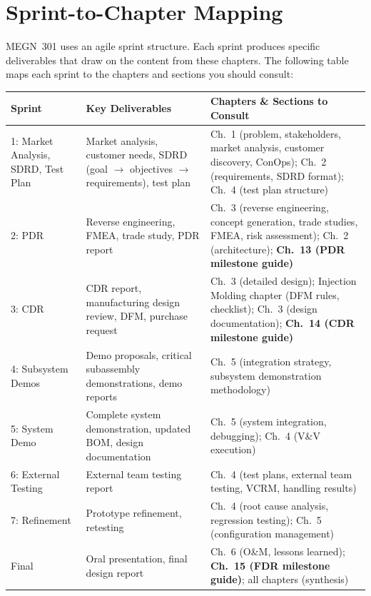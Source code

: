 \documentclass[11pt,letterpaper,twoside,openany]{book}
\begin{document}
\section*{Sprint-to-Chapter Mapping}

MEGN~301 uses an agile sprint structure. Each sprint produces specific deliverables that draw on the content from these chapters. The following table maps each sprint to the chapters and sections you should consult:

\begin{center}
\small
\begin{tabularx}{\textwidth}{l X X}
\toprule
\textbf{Sprint} & \textbf{Key Deliverables} & \textbf{Chapters \& Sections to Consult} \\
\midrule
1: Market Analysis, SDRD, Test Plan & Market analysis, customer needs, SDRD (goal $\to$ objectives $\to$ requirements), test plan & Ch.~1 (problem, stakeholders, market analysis, customer discovery, ConOps); Ch.~2 (requirements, SDRD format); Ch.~4 (test plan structure) \\
2: PDR & Reverse engineering, FMEA, trade study, PDR report & Ch.~3 (reverse engineering, concept generation, trade studies, FMEA, risk assessment); Ch.~2 (architecture); \textbf{Ch.~13 (PDR milestone guide)} \\
3: CDR & CDR report, manufacturing design review, DFM, purchase request & Ch.~3 (detailed design); Injection Molding chapter (DFM rules, checklist); Ch.~3 (design documentation); \textbf{Ch.~14 (CDR milestone guide)} \\
4: Subsystem Demos & Demo proposals, critical subassembly demonstrations, demo reports & Ch.~5 (integration strategy, subsystem demonstration methodology) \\
5: System Demo & Complete system demonstration, updated BOM, design documentation & Ch.~5 (system integration, debugging); Ch.~4 (V\&V execution) \\
6: External Testing & External team testing report & Ch.~4 (test plans, external team testing, VCRM, handling results) \\
7: Refinement & Prototype refinement, retesting & Ch.~4 (root cause analysis, regression testing); Ch.~5 (configuration management) \\
Final & Oral presentation, final design report & Ch.~6 (O\&M, lessons learned); \textbf{Ch.~15 (FDR milestone guide)}; all chapters (synthesis) \\
\bottomrule
\end{tabularx}
\end{center}
\end{document}

